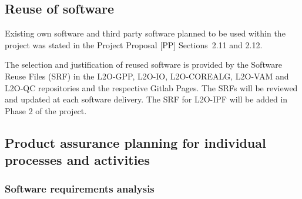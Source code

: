 \subsection{Reuse of software}
\label{subsec:reused-software}


%

Existing own software and third party software planned to be used within the project was stated in the Project Proposal [PP] Sections~2.11 and 2.12.

The selection and justification of reused software is provided by the Software Reuse Files (SRF) in the L2O-GPP, L2O-IO, L2O-COREALG, L2O-VAM and L2O-QC repositories and the respective Gitlab Pages. The SRFs will be reviewed and updated at each software delivery. The SRF for L2O-IPF will be added in Phase 2 of the project.


\subsection{Product assurance planning for individual processes and activities}

%
%
%
%
%
%
%

\subsubsection{Software requirements analysis}
\label{subsec:software-requirements-analysis}

%
%
%
%
%
%

